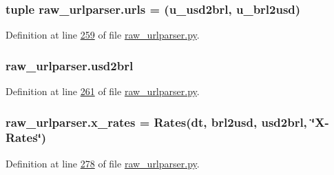 \subsubsection[{\texorpdfstring{urls}{urls}}]{\setlength{\rightskip}{0pt plus 5cm}tuple raw\+\_\+urlparser.\+urls = ({\bf u\+\_\+usd2brl}, {\bf u\+\_\+brl2usd})}\hypertarget{namespaceraw__urlparser_aded92a1146e1ce1f14fd79a361f947f9}{}\label{namespaceraw__urlparser_aded92a1146e1ce1f14fd79a361f947f9}


Definition at line \hyperlink{raw__urlparser_8py_source_l00259}{259} of file \hyperlink{raw__urlparser_8py_source}{raw\+\_\+urlparser.\+py}.

\subsubsection[{\texorpdfstring{usd2brl}{usd2brl}}]{\setlength{\rightskip}{0pt plus 5cm}raw\+\_\+urlparser.\+usd2brl}\hypertarget{namespaceraw__urlparser_adb724d2d0b7c561e8b0c53a42831efce}{}\label{namespaceraw__urlparser_adb724d2d0b7c561e8b0c53a42831efce}


Definition at line \hyperlink{raw__urlparser_8py_source_l00261}{261} of file \hyperlink{raw__urlparser_8py_source}{raw\+\_\+urlparser.\+py}.

\subsubsection[{\texorpdfstring{x\+\_\+rates}{x_rates}}]{\setlength{\rightskip}{0pt plus 5cm}raw\+\_\+urlparser.\+x\+\_\+rates = {\bf Rates}({\bf dt}, {\bf brl2usd}, {\bf usd2brl}, \char`\"{}X-\/{\bf Rates}\char`\"{})}\hypertarget{namespaceraw__urlparser_a76bac0500149c0b7dc5e8dfef56f05c3}{}\label{namespaceraw__urlparser_a76bac0500149c0b7dc5e8dfef56f05c3}


Definition at line \hyperlink{raw__urlparser_8py_source_l00278}{278} of file \hyperlink{raw__urlparser_8py_source}{raw\+\_\+urlparser.\+py}.

